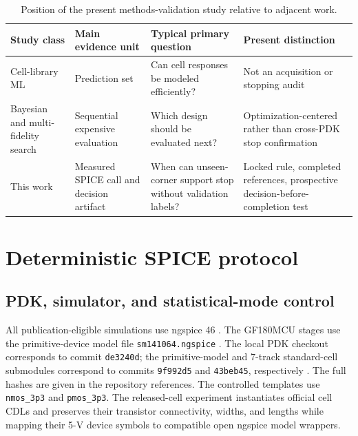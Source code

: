 \documentclass[preprint,12pt]{elsarticle}
\begin{document}
\begin{table}[t]
\centering
\caption{Position of the present methods-validation study relative to adjacent work.}
\label{tab:study-position}
\small
\setlength{\tabcolsep}{4pt}
\begin{tabular}{p{}p{}p{}p{}}
\toprule
Study class & Main evidence unit & Typical primary question & Present distinction \\
\midrule
Cell-library ML \cite{Klemme_CellLib_ML_DTCO_ICCAD_2020,Klemme_Reliability_CellLib_TCASI_2021,Tang_KnowledgeTransfer_CellLib_MEJO_2025,Ma_GNN_CellLib_Integration_2025} & Prediction set & Can cell responses be modeled efficiently? & Not an acquisition or stopping audit \\
Bayesian and multi-fidelity search \cite{Lyu_Bayesian_Analog_2018,Zhang_MultiFidelity_BO_DAC_2019,He_Batched_MultiFidelity_BO_TCAD_2023} & Sequential expensive evaluation & Which design should be evaluated next? & Optimization-centered rather than cross-PDK stop confirmation \\
This work & Measured SPICE call and decision artifact & When can unseen-corner support stop without validation labels? & Locked rule, completed references, prospective decision-before-completion test \\
\bottomrule
\end{tabular}
\end{table}

\section{Deterministic SPICE protocol}

\subsection{PDK, simulator, and statistical-mode control}

All publication-eligible simulations use ngspice 46 \cite{Ngspice_Manual}. The GF180MCU stages use the primitive-device model file \texttt{sm141064.ngspice} \cite{Google_GF180MCU_PDK_GitHub,GF180MCU_ReadTheDocs_CustomDesign,GF180MCU_Model_sm141064}. The local PDK checkout corresponds to commit \texttt{de3240d}; the primitive-model and 7-track standard-cell submodules correspond to commits \texttt{9f992d5} and \texttt{43beb45}, respectively \cite{GF180MCU_ReadTheDocs_StdCells_7Track}. The full hashes are given in the repository references. The controlled templates use \texttt{nmos\_3p3} and \texttt{pmos\_3p3}. The released-cell experiment instantiates official cell CDLs and preserves their transistor connectivity, widths, and lengths while mapping their 5-V device symbols to compatible open ngspice model wrappers.
\end{document}
